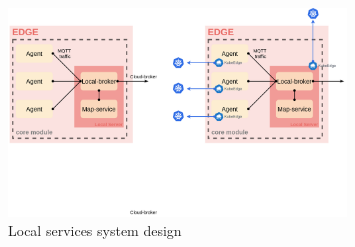 \begin{figure}[H]
    \centering
    \includegraphics[width=0.8\textwidth]{pictures/local_service.png}
    \caption{ Local services system design }
    \label{fig:local_services}
\end{figure}
